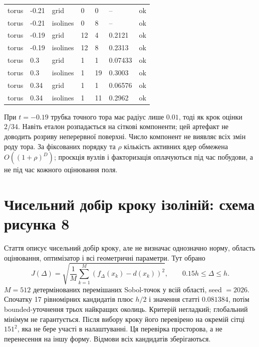 \documentclass[11pt,a4paper]{article}
\begin{document}
\begin{center}
{\begin{tabular}{lllllll}
torus & -0.21 & grid & 0 & 0 & -- & ok\\
torus & -0.21 & isolines & 0 & 8 & -- & ok\\
torus & -0.19 & grid & 12 & 4 & 0.2121 & ok\\
torus & -0.19 & isolines & 12 & 8 & 0.2313 & ok\\
torus & 0.3 & grid & 1 & 1 & 0.07433 & ok\\
torus & 0.3 & isolines & 1 & 19 & 0.3003 & ok\\
torus & 0.34 & grid & 1 & 1 & 0.06576 & ok\\
torus & 0.34 & isolines & 1 & 11 & 0.2962 & ok\\
\bottomrule\end{tabular}}\end{center}

При $t=-0.19$ трубка точного тора має радіус лише $0.01$,
тоді як крок оцінки $2/34$. Навіть еталон розпадається на сіткові
компоненти; цей артефакт не доводить розриву неперервної поверхні.
Число компонент не виявляє всіх змін роду тора.
За фіксованих порядку та $\rho$ кількість активних ядер обмежена
$O((1+\rho)^D)$; проєкція вузлів і факторизація оплачуються під час
побудови, а не під час кожного оцінювання поля.

\section*{Чисельний добір кроку ізоліній: схема рисунка 8}
Стаття описує чисельний добір кроку, але не визначає однозначно
норму, область оцінювання, оптимізатор і всі геометричні параметри.
Тут обрано
\[
 J(\Delta)=\sqrt{\frac1M\sum_{k=1}^M
 (f_\Delta(x_k)-d(x_k))^2},
 \qquad 0.15h\le\Delta\le h.
\]
$M=512$ детермінованих перемішаних Sobol-точок у всій області,
seed $=2026$. Спочатку 17 рівномірних кандидатів плюс $h/2$ і
значення статті $0.081384$, потім bounded-уточнення трьох найкращих
околиць. Критерій негладкий; глобальний мінімум не гарантується.
Після вибору кроку його перевірено на окремій сітці $151^2$,
яка не бере участі в налаштуванні. Ця перевірка просторова,
а не перенесення на іншу форму. Відмови всіх кандидатів зберігаються.
\begin{center}\small{}\end{center}
\begin{center}\small{}\end{center}
\end{document}

